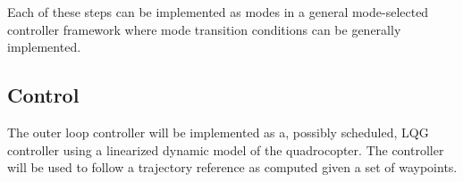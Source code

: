         Each of these steps can be implemented as modes in a general
        mode-selected controller framework where mode transition conditions
        can be generally implemented.

    \subsection{Control}
        The outer loop controller will be implemented as a, possibly scheduled,
        LQG controller using a linearized dynamic model of the quadrocopter.
        The controller will be used to follow a trajectory reference as computed
        given a set of waypoints.
